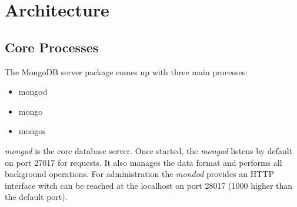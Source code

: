 \chapter{Architecture}
\section{Core Processes}
The MongoDB server package comes up with three main processes:
\begin{itemize}
  \item mongod
  \item mongo
  \item mongos
\end{itemize}
\textit{mongod} is the core database server. Once started, the \textit{mongod} listens by default on port 27017 for requests. It also manages the data format and performs all background operations. For administration the \textit{mondod} provides an HTTP interface witch can be reached at the localhost on port 28017 (1000 higher than the default port). \\
